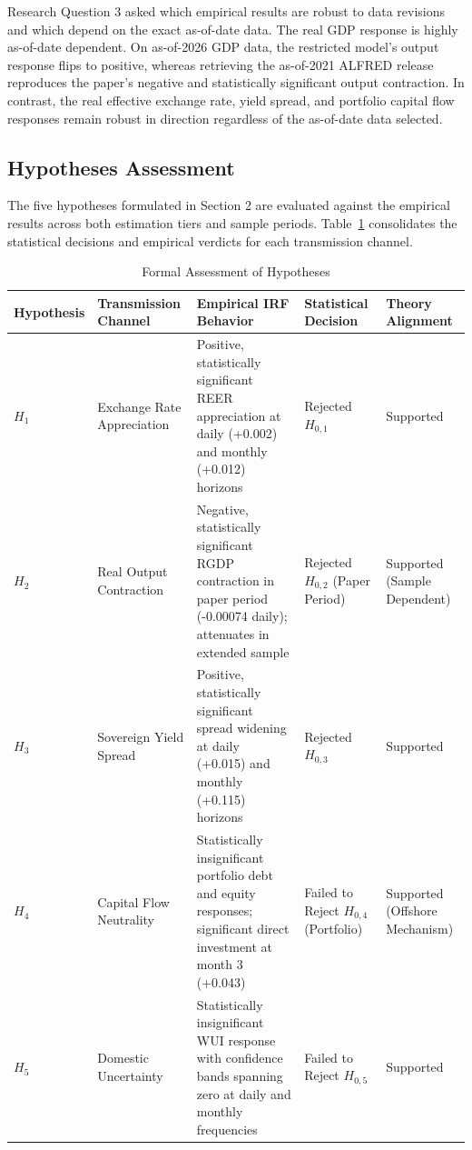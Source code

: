 Research Question 3 asked which empirical results are robust to data revisions and which depend on the exact as-of-date data. The real GDP response is highly as-of-date dependent. On as-of-2026 GDP data, the restricted model's output response flips to positive, whereas retrieving the as-of-2021 ALFRED release reproduces the paper's negative and statistically significant output contraction. In contrast, the real effective exchange rate, yield spread, and portfolio capital flow responses remain robust in direction regardless of the as-of-date data selected.

\FloatBarrier

\subsection{Hypotheses Assessment}

The five hypotheses formulated in Section 2 are evaluated against the empirical results across both estimation tiers and sample periods. Table~\ref{tab:hypotheses_verdict} consolidates the statistical decisions and empirical verdicts for each transmission channel.

\FloatBarrier
\begin{table}[H]
  \centering
  \caption{Formal Assessment of Hypotheses}
  \label{tab:hypotheses_verdict}
  \small
  \begin{tabularx}{\textwidth}{@{}l p{2.8cm} X p{2.8cm} p{2.2cm}@{}}
    \toprule
    Hypothesis & Transmission Channel & Empirical IRF Behavior & Statistical Decision & Theory Alignment \\
    \midrule
    $H_1$ & Exchange Rate Appreciation & Positive, statistically significant REER appreciation at daily (+0.002) and monthly (+0.012) horizons & Rejected $H_{0,1}$ & Supported \\
    $H_2$ & Real Output Contraction & Negative, statistically significant RGDP contraction in paper period (-0.00074 daily); attenuates in extended sample & Rejected $H_{0,2}$ (Paper Period) & Supported (Sample Dependent) \\
    $H_3$ & Sovereign Yield Spread & Positive, statistically significant spread widening at daily (+0.015) and monthly (+0.115) horizons & Rejected $H_{0,3}$ & Supported \\
    $H_4$ & Capital Flow Neutrality & Statistically insignificant portfolio debt and equity responses; significant direct investment at month 3 (+0.043) & Failed to Reject $H_{0,4}$ (Portfolio) & Supported (Offshore Mechanism) \\
    $H_5$ & Domestic Uncertainty & Statistically insignificant WUI response with confidence bands spanning zero at daily and monthly frequencies & Failed to Reject $H_{0,5}$ & Supported \\
    \bottomrule
  \end{tabularx}
\end{table}
\FloatBarrier

